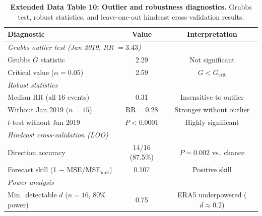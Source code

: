 \documentclass[11pt,letterpaper]{article}
\begin{document}
\begin{table}[!ht]
\centering
\caption{\textbf{Extended Data Table 10: Outlier and robustness diagnostics.}
Grubbs test, robust statistics, and leave-one-out hindcast cross-validation results.}
\label{tab:outlier}
\small
\begin{tabular}{lcc}
\toprule
Diagnostic & Value & Interpretation \\
\midrule
\multicolumn{3}{l}{\textit{Grubbs outlier test (Jan 2019, RR $= 3.43$)}} \\
Grubbs $G$ statistic & 2.29 & Not significant \\
Critical value ($\alpha = 0.05$) & 2.59 & $G < G_{\mathrm{crit}}$ \\
\midrule
\multicolumn{3}{l}{\textit{Robust statistics}} \\
Median RR (all 16 events) & 0.31 & Insensitive to outlier \\
Without Jan 2019 ($n = 15$) & $\mathrm{RR} = 0.28$ & Stronger without outlier \\
$t$-test without Jan 2019 & $P < 0.0001$ & Highly significant \\
\midrule
\multicolumn{3}{l}{\textit{Hindcast cross-validation (LOO)}} \\
Direction accuracy & 14/16 (87.5\%) & $P = 0.002$ vs.\ chance \\
Forecast skill (1 $-$ MSE/MSE$_{\mathrm{null}}$) & 0.107 & Positive skill \\
\midrule
\multicolumn{3}{l}{\textit{Power analysis}} \\
Min.\ detectable $d$ ($n = 16$, 80\% power) & 0.75 & ERA5 underpowered ($d \approx 0.2$) \\
\bottomrule
\end{tabular}
\end{table}
\end{document}
